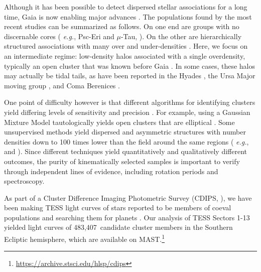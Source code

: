 \documentclass[12pt,twocolumn,tighten]{aastex63}
\newcommand{\numsouthernuniqlcs}{483{,}407} %
\begin{document}
Although it has been possible to detect dispersed stellar associations
for a long time, Gaia is now enabling major advances \citep[{\it
e.g.},][]{de_zeeuw_hipparcos_1999,bergond_gravitational_2001,zuckerman_young_2004,oh_comoving_2017,cantatgaudin_gaia_2018,gagne_banyan_XII_2018,gagne_banyan_XIII_2018,kounkel_apogee2_2018,zari_3d_2018,kounkel_untangling_2019,furnkranz_2019}.
The populations found by the most recent studies can be summarized as
follows.  On one end are groups with no discernable cores ({\it
e.g.}, Psc-Eri and $\mu$-Tau,
\citealt{meingast_psceri_2019,curtis_tess_2019,gagne_mutau_2020}).  On
the other are hierarchically structured associations with many over
and under-densities  \citep[{\it e.g.} the Sco-Cen and Vela
associations,][]{pecaut_star_2016,cantatgaudin_velaOB2_2019}.  Here,
we focus on an intermediate regime: low-density halos associated with
a single overdensity, typically an open cluster that was known before
Gaia
\citep[see][]{kounkel_untangling_2019,kounkel_untanglingII_2020,meingast_2021}.
In some cases, these halos may actually be tidal tails, as have been
reported in the Hyades \citep{meingast_hyades_2019,roser_hyades_2019},
the Ursa Major moving group \citep{gagne_lowmassUMA_2020}, and Coma
Berenices \citep{tang_comaber_2019,furnkranz_2019}. 

One point of difficulty however is that different algorithms for
identifying clusters yield differing levels of sensitivity and
precision \citep{hunt_clustering_2020}.  For example, using a Gaussian
Mixture Model tautologically yields open clusters that are elliptical
\citep[{\it e.g.},][]{wallace_m4_2018}.  Some unsupervised methods
yield dispersed and asymmetric structures with number densities down
to 100 times lower than the field around the same regions ({\it
e.g.}, \citealt{kounkel_untangling_2019} and \citealt{meingast_2021}).
Since different techniques yield quantitatively and
qualitatively different outcomes, the purity of kinematically selected
samples is important to verify through independent lines of evidence,
including rotation periods and spectroscopy.

As part of a Cluster Difference Imaging Photometric Survey (CDIPS,
\citealt{bouma_cdipsI_2019}), we have been making TESS light
curves of stars reported to be members of coeval populations and
searching them for planets \citep{bouma_cluster_2020}.  Our analysis
of TESS Sectors 1-13 yielded light curves of \numsouthernuniqlcs\
candidate cluster members in the Southern Ecliptic hemisphere, which
are available on
MAST.\footnote{\url{https://archive.stsci.edu/hlsp/cdips}}
\end{document}
